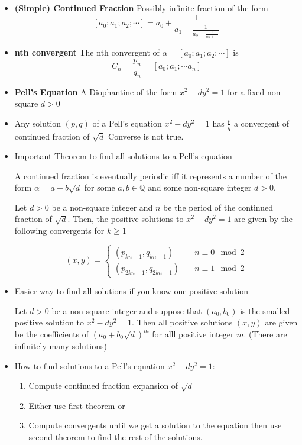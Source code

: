 \documentclass[a4paper, 12pt]
{article}
\begin{document}
	\begin{itemize}
		\item \textbf{(Simple) Continued Fraction} Possibly infinite fraction of the form
		$$[a_0; a_1; a_2; \cdots] = a_0+ \frac{1}{a_1+\frac{1}{a_2+\frac{1}{a_3+ \cdots}}}$$
		
		\item \textbf{nth convergent} The nth convergent of $\alpha=[a_0; a_1; a_2; \cdots]$ is 
		$$C_n = \frac{p_n}{q_n}= [a_0; a_1; \cdots a_n]$$
		
		\item \textbf{Pell's Equation} A Diophantine of the form $x^2 -dy^2 = 1$ for a fixed non-square $d>0$
		
		\item Any solution $(p,q)$ of a Pell's equation  $x^2 -dy^2 = 1$ has $\frac{p}{q}$ a convergent of continued fraction of $\sqrt{d}$ Converse is not true.
		
		\item Important Theorem to find all solutions to a Pell's equation
		
		A continued fraction is eventually periodic iff it represents a number of the form $\alpha = a + b \sqrt{d}$ for some $a,b \in \mathbb{Q}$ and some non-square integer $d >0.$
		
		Let $d>0$ be a non-square integer and $n$ be the period of the continued fraction of $\sqrt{d}.$ Then, the positive solutions to $x^2 -dy^2 = 1$ are given by the following convergents for $k \geq 1$
		
		\begin{equation*}
			(x,y) = 
			\begin{cases}
				(p_{kn-1}, q_{kn-1}) \quad &n\equiv 0 \mod2\\
				(p_{2kn-1}, q_{2kn-1}) \quad &n\equiv1 \mod 2
			\end{cases}
		\end{equation*}
		
		\item Easier way to find all solutions if you know one positive solution
		
		Let $d>0$ be a non-square integer and suppose that $(a_0, b_0)$ is the smalled positive solution to $x^2 -dy^2 = 1.$ Then all positive solutions $(x,y)$ are given be the coefficients of $(a_0 + b_0 \sqrt{d})^m$ for alll positive integer $m.$ (There are infinitely many solutions)
		
		
		\item How to find solutions to a Pell's equation $x^2 -dy^2 = 1:$
		
		\begin{enumerate}
			\item Compute continued fraction expansion of $\sqrt{d}$
			\item Either use first theorem or
			\item Compute convergents until we get a solution to the equation then use second theorem to find the rest of the solutions.
		\end{enumerate}
	\end{itemize}
	
\end{document}

